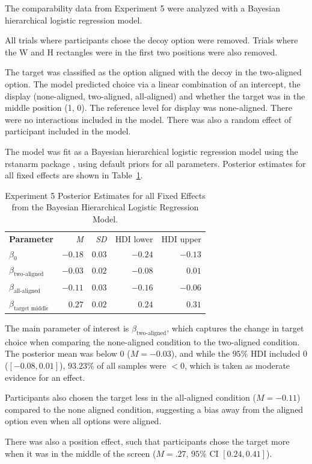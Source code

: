 The comparability data from Experiment 5 were analyzed with a Bayesian hierarchical logistic regression model.

All trials where participants chose the decoy option were removed. Trials where the W and H rectangles were in the first two positions were also removed. 

The target was classified as the option aligned with the decoy in the two-aligned option. The model predicted choice via a linear combination of an intercept, the display (none-aligned, two-aligned, all-aligned) and whether the target was in the middle position (1, 0). The reference level for display was none-aligned. There were no interactions included in the model. There was also a random effect of participant included in the model. 

The model was fit as a Bayesian hierarchical logistic regression model using the rstanarm package \parencite{rstanarm}, using default priors for all parameters. Posterior estimates for all fixed effects are shown in Table~\ref{tab:e5_logit_params}.

\begin{table}[ht]
    \centering
    \begin{tabular}{lrrrr}
        \toprule
        \textbf{Parameter} & \textit{M} & \textit{SD} & HDI lower & HDI upper \\
        $\beta_{0}$        & $-0.18$    &  $0.03$     & $-0.24$   & $-0.13$   \\
        $\beta_{\text{two-aligned}}$ & $-0.03$ & $0.02$ & $-0.08$ & $0.01$    \\
        $\beta_{\text{all-aligned}}$ & $-0.11$ & $0.03$ & $-0.16$ & $-0.06$   \\
        $\beta_{\text{target middle}}$ & $0.27$ & $0.02$ & $0.24$ & $0.31$    \\
        \bottomrule
    \end{tabular}
    \caption{Experiment 5 Posterior Estimates for all Fixed Effects from the Bayesian Hierarchical Logistic Regression Model.}
    \label{tab:e5_logit_params}
\end{table}

The main parameter of interest is $\beta_{\text{two-aligned}}$, which captures the change in target choice when comparing the none-aligned condition to the two-aligned condition. The posterior mean was below $0$ ($\mathit{M}=-0.03$), and while the $95\%$ HDI included 0 ($[-0.08, 0.01]$), $93.23\%$ of all samples were $<0$, which is taken as moderate evidence for an effect. 

Participants also chosen the target less in the all-aligned condition ($\mathit{M}=-0.11$) compared to the none aligned condition, suggesting a bias away from the aligned option even when all options were aligned. 

There was also a position effect, such that participants chose the target more when it was in the middle of the screen ($\mathit{M}=.27$, $95\%$ CI $[0.24,0.41]$). 